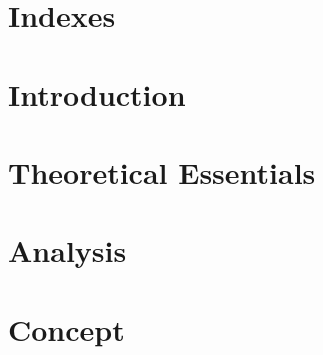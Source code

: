 \documentclass[13pt,pdftex,a4paper]{scrreprt}
\begin{document}


\renewcommand\chaptername{}
\renewcommand\thechapter{}

\pagestyle{plain}
\newpage

%

%

\newpage






\tableofcontents

\pagestyle{fancyStyle}

\chapter*{Indexes}


\listoffigures
\newpage

\listoftables
\newpage

\lstlistoflistings
\newpage

\renewcommand\chaptername{Chapter}
\renewcommand\thechapter{\arabic{chapter}}


\chapter{Introduction}
\label{introduction}


\chapter{Theoretical Essentials}
\label{preliminaries}


\chapter{Analysis}
\label{analysis}


\chapter{Concept}
\label{concept}

\end{document}
